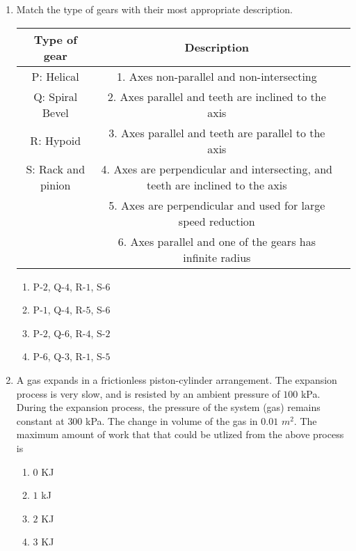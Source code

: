 \documentclass[journal]{IEEEtran}
\begin{document}
\begin{enumerate}[start=35]
    \item Match the type of gears with their most appropriate description.\\
    \begin{tabular}{|c|c|p{1cm}|}
    \hline
    \textbf{Type of gear} & \textbf{Description} \\
    \hline
    P: Helical & 1. Axes non-parallel and non-intersecting \\
    \hline
    Q: Spiral Bevel & 2. Axes parallel and teeth are inclined to the axis \\
    \hline
    R: Hypoid & 3. Axes parallel and teeth are parallel to the axis \\
    \hline
    S: Rack and pinion & 4. Axes are perpendicular and intersecting, and teeth are inclined to the axis \\
    \hline
    & 5. Axes are perpendicular and used for large speed reduction \\
    \hline
    & 6. Axes parallel and one of the gears has infinite radius \\
    \hline 
    \end{tabular}
    
    \begin{multicols}{2}
    \begin{enumerate}
        \item P-$2$, Q-$4$, R-$1$, S-$6$
        \item P-$1$, Q-$4$, R-$5$, S-$6$
        \item P-$2$, Q-$6$, R-$4$, S-$2$
        \item P-$6$, Q-$3$, R-$1$, S-$5$
    \end{enumerate}
    \end{multicols}

    \item A gas expands in a frictionless piston-cylinder arrangement. The expansion process is very slow, and is resisted by an ambient pressure of $100$ kPa. During the expansion process, the pressure of the system (gas) remains constant at $300$ kPa. The change in volume of the gas in $0.01$ $m^2$. The maximum amount of work that that could be utlized from the above process is
    \begin{multicols}{4}
    \begin{enumerate}
        \item $0$ KJ
        \item $1$ kJ
        \item $2$ KJ
        \item $3$ KJ
    \end{enumerate}
    \end{multicols}


\end{enumerate}
\end{document}
